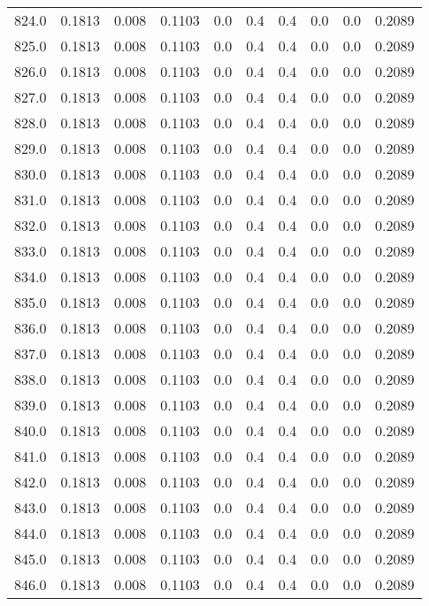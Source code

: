 \begin{longtable}{lrrrrrrrrr}
824.0 & 0.1813 & 0.008 & 0.1103 & 0.0 & 0.4 & 0.4 & 0.0 & 0.0 & 0.2089 \\
825.0 & 0.1813 & 0.008 & 0.1103 & 0.0 & 0.4 & 0.4 & 0.0 & 0.0 & 0.2089 \\
826.0 & 0.1813 & 0.008 & 0.1103 & 0.0 & 0.4 & 0.4 & 0.0 & 0.0 & 0.2089 \\
827.0 & 0.1813 & 0.008 & 0.1103 & 0.0 & 0.4 & 0.4 & 0.0 & 0.0 & 0.2089 \\
828.0 & 0.1813 & 0.008 & 0.1103 & 0.0 & 0.4 & 0.4 & 0.0 & 0.0 & 0.2089 \\
829.0 & 0.1813 & 0.008 & 0.1103 & 0.0 & 0.4 & 0.4 & 0.0 & 0.0 & 0.2089 \\
830.0 & 0.1813 & 0.008 & 0.1103 & 0.0 & 0.4 & 0.4 & 0.0 & 0.0 & 0.2089 \\
831.0 & 0.1813 & 0.008 & 0.1103 & 0.0 & 0.4 & 0.4 & 0.0 & 0.0 & 0.2089 \\
832.0 & 0.1813 & 0.008 & 0.1103 & 0.0 & 0.4 & 0.4 & 0.0 & 0.0 & 0.2089 \\
833.0 & 0.1813 & 0.008 & 0.1103 & 0.0 & 0.4 & 0.4 & 0.0 & 0.0 & 0.2089 \\
834.0 & 0.1813 & 0.008 & 0.1103 & 0.0 & 0.4 & 0.4 & 0.0 & 0.0 & 0.2089 \\
835.0 & 0.1813 & 0.008 & 0.1103 & 0.0 & 0.4 & 0.4 & 0.0 & 0.0 & 0.2089 \\
836.0 & 0.1813 & 0.008 & 0.1103 & 0.0 & 0.4 & 0.4 & 0.0 & 0.0 & 0.2089 \\
837.0 & 0.1813 & 0.008 & 0.1103 & 0.0 & 0.4 & 0.4 & 0.0 & 0.0 & 0.2089 \\
838.0 & 0.1813 & 0.008 & 0.1103 & 0.0 & 0.4 & 0.4 & 0.0 & 0.0 & 0.2089 \\
839.0 & 0.1813 & 0.008 & 0.1103 & 0.0 & 0.4 & 0.4 & 0.0 & 0.0 & 0.2089 \\
840.0 & 0.1813 & 0.008 & 0.1103 & 0.0 & 0.4 & 0.4 & 0.0 & 0.0 & 0.2089 \\
841.0 & 0.1813 & 0.008 & 0.1103 & 0.0 & 0.4 & 0.4 & 0.0 & 0.0 & 0.2089 \\
842.0 & 0.1813 & 0.008 & 0.1103 & 0.0 & 0.4 & 0.4 & 0.0 & 0.0 & 0.2089 \\
843.0 & 0.1813 & 0.008 & 0.1103 & 0.0 & 0.4 & 0.4 & 0.0 & 0.0 & 0.2089 \\
844.0 & 0.1813 & 0.008 & 0.1103 & 0.0 & 0.4 & 0.4 & 0.0 & 0.0 & 0.2089 \\
845.0 & 0.1813 & 0.008 & 0.1103 & 0.0 & 0.4 & 0.4 & 0.0 & 0.0 & 0.2089 \\
846.0 & 0.1813 & 0.008 & 0.1103 & 0.0 & 0.4 & 0.4 & 0.0 & 0.0 & 0.2089 \\

\end{longtable}
